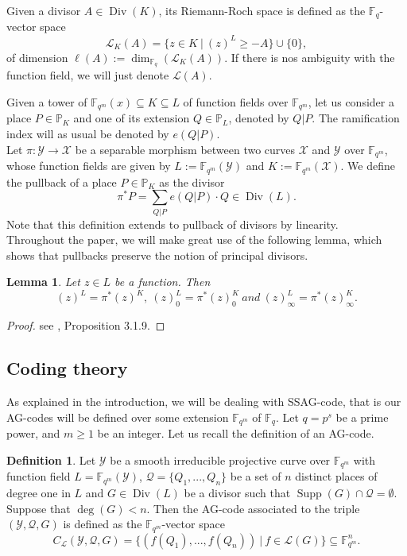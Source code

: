 \documentclass[10pt]{article}
\newtheorem{lem1}[thm]{Lemma}
\theoremstyle{definition}
\theoremstyle{definition}
\theoremstyle{definition}
\newtheorem{def1}[thm]{Definition}
\newcommand{\s}{\vspace{0.3cm}}
\newcommand{\cd}{\cdot}
\newcommand{\PP}{\mathbb{P}}
\newcommand{\fqm}{\mathbb{F}_{q^m}}
\newcommand{\fq}{\mathbb{F}_q}
\newcommand{\su}{\subseteq}
\newcommand{\X}{\mathcal{X}}
\newcommand{\Y}{\mathcal{Y}}
\newcommand{\QR}{\mathcal{Q}}
\newcommand{\Div}{\operatorname{Div}}
\newcommand{\Supp}{\operatorname{Supp}}
\newcommand{\calL}{\mathcal{L}}
\begin{document}
Given a divisor $A \in \Div(K)$, its Riemann-Roch space is defined as the $\fq$-vector space
\[\calL_K(A) = \{z \in K \ | \ (z)^L \geq -A\} \cup \{0\},\]
of dimension $\ell(A):= \dim_{\fq}(\calL_K(A))$. If there is nos ambiguity with the function field, we will just denote $\calL(A)$.

\s

Given a tower of $\fqm(x) \su K \su L$ of function fields over $\fqm$, let us consider a place  $P \in \PP_K$ and one of its extension $Q \in \PP_L$, denoted by $Q|P$. The ramification index will as usual be denoted by $e(Q|P)$. \\
Let $\pi : \Y \rightarrow \X$ be a separable morphism between two curves $\X$ and $\Y$ over $\fqm$, whose function fields are given by $L := \fqm(\Y)$ and $K:=\fqm(\X)$. We define the pullback of a place $P \in \PP_K$ as the divisor
\[\pi^{*}P = \sum\limits_{Q|P} e(Q|P) \cd Q \in \Div(L).\]
Note that this definition extends to pullback of divisors by linearity. \\
Throughout the paper, we will make great use of the following lemma, which shows that pullbacks preserve the notion of principal divisors.

\s

\begin{lem1} \label{tirarr}
Let $z \in L$ be a function. Then 
\[(z)^L = \pi^*(z)^K, \ (z)^L_0 = \pi^*(z)_0^K \ and \ (z)^L_{\infty} = \pi^*(z)^K_{\infty}.\]
\end{lem1} 

\s

\begin{proof}
see \cite{Sti}, Proposition 3.1.9.
\end{proof}

\s

\subsection{Coding theory}

\s

As explained in the introduction, we will be dealing with SSAG-code, that is our AG-codes will be defined over some extension $\fqm$ of $\fq$. Let $q=p^s$ be a prime power, and $m \geq 1$ be an integer. Let us recall the definition of an AG-code.

\s

\begin{def1} \label{defagcode}
Let $\Y$ be a smooth \color{purple} irreducible \color{black} projective curve over $\fqm$ with function field $L = \fqm(\Y)$, $\QR = \{Q_1,...,Q_n\}$ be a set of $n$ distinct places of degree one in $L$  and $G \in \Div(L)$ be a divisor such that $\Supp(G) \cap \QR = \emptyset$. Suppose that $\deg(G)<n$. Then the AG-code associated to the triple $(\Y,\QR,G)$ is defined  as the $\fqm$-vector space
\[C_{\calL}(\Y,\QR,G) = \{ (f(Q_1),...,f(Q_n)) \ | \ f \in \calL(G)\} \su \fqm^n.\]
\end{def1}
\end{document}
